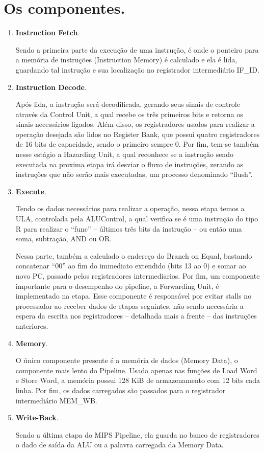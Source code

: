 \documentclass[a4paper, 11pt]{article}
\begin{document}
\section{Os componentes.}
\begin{enumerate}
    \item \textbf{Instruction Fetch}.

    Sendo a primeira parte da execução de uma instrução, é onde o ponteiro para a
    memória de instruções (Instruction Memory) é calculado e ela é lida, guardando tal
    instrução e sua localização no registrador intermediário IF\_ID.

    \item \textbf{Instruction Decode}.

    Após lida, a instrução será decodificada, gerando seus sinais de controle através
    da Control Unit, a qual recebe os três primeiros bits e retorna os sinais necessários
    ligados. Além disso, os registradores usados para realizar a operação desejada são
    lidos no Register Bank, que possui quatro registradores de 16 bits de capacidade,
    sendo o primeiro sempre 0. Por fim, tem-se também nesse estágio a Hazarding Unit,
    a qual reconhece se a instrução sendo executada na proxima etapa irá desviar o fluxo
    de instruções, zerando as instruções que não serão mais executadas, um processo
    denominado “flush”.

    \item \textbf{Execute}.

    Tendo os dados necessários para realizar a operação, nessa etapa temos a ULA,
    controlada pela ALUControl, a qual verifica se é uma instrução do tipo R para
    realizar o “func” – últimos três bits da instrução – ou então uma soma,
    subtração, AND ou OR.

    Nessa parte, também a calculado o endereço do Branch on Equal,  bastando concatenar
    “00” ao fim do immediato extendido (bits 13 ao 0) e somar ao novo PC, passado pelos
    registradores intermediarios. Por fim, um componente importante para o desempenho do
    pipeline, a Forwarding Unit, é implementado na etapa. Esse componente é responsável
    por evitar stalls no processador ao receber dados de etapas seguintes, não sendo
    necessária a espera da escrita nos registradores – detalhada mais a frente – das
    instruções anteriores.

    \item \textbf{Memory}.

    O único componente presente é a memória de dados (Memory Data), o componente mais
    lento do Pipeline. Usada apenas nas funções de Load Word e Store Word, a memória
    possui 128 KiB de armazenamento com 12 bits cada linha. Por fim, os dados carregados
    são passados para o registrador intermediário MEM\_WB.
    
    \item \textbf{Write-Back}.

    Sendo a última etapa do MIPS Pipeline, ela guarda no banco de registradores o
    dado de saída da ALU ou a palavra carregada da Memory Data.
\end{enumerate}
\end{document}

